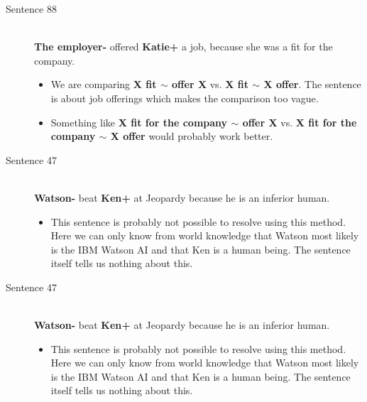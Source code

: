 \documentclass{article}
\begin{document}
\begin{description}
  \item[Sentence 88] \hfill \\
  {\bf The employer-} offered {\bf Katie+} a job, because she was a fit for the company.
  \begin{itemize}
  	\item We are comparing {\bf X fit $\sim$ offer X} vs. {\bf X fit $\sim$ X offer}. The sentence is about job offerings which makes the comparison too vague.
  	\item Something like {\bf X fit for the company $\sim$ offer X} vs. {\bf X fit for the company $\sim$ X offer} would probably work better.
  \end{itemize}

  \item[Sentence 47] \hfill \\
  {\bf Watson-} beat {\bf Ken+} at Jeopardy because he is an inferior human.
  \begin{itemize}
  	\item This sentence is probably not possible to resolve using this method. Here we can only know from world knowledge that Watson most likely is the IBM Watson AI and that Ken is a human being. The sentence itself tells us nothing about this.
  \end{itemize}

  \item[Sentence 47] \hfill \\
  {\bf Watson-} beat {\bf Ken+} at Jeopardy because he is an inferior human.
  \begin{itemize}
  	\item This sentence is probably not possible to resolve using this method. Here we can only know from world knowledge that Watson most likely is the IBM Watson AI and that Ken is a human being. The sentence itself tells us nothing about this.
  \end{itemize}

\end{description}

\end{document}
